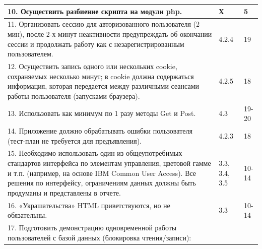 \documentclass[a4paper,12pt]{article}
\begin{document}
\begin{longtable}{|p{7cm}|p{3cm}|p{3cm}|}
    \hline
    10. Осуществить разбиение скрипта на модули php.                                                      & Х                                    & 5                                                                                       \\
    \hline
    11. Организовать сессию для авторизованного пользователя (2 мин),
    после 2-х минут неактивности предупреждать об окончании сессии и
    продолжать работу как с незарегистрированным пользователем.                                           & 4.2.4                                & 19                                                                                      \\
    \hline
    12. Осуществить запись одного или нескольких cookie, сохраняемых несколько минут;
    в cookie должна содержаться информация, которая передается между
    различными сеансами работы пользователя (запусками браузера).                                         & 4.2.5                                & 18                                                                                      \\
    \hline
    13. Использовать как минимум по 1 разу методы Get и Post.                                             & 4.3                                  & 19-20                                                                                   \\
    \hline
    14. Приложение должно обрабатывать ошибки пользователя
    (тест-план не требуется для предъявления).                                                            & 4.2.3                                & 18                                                                                      \\
    \hline
    15. Необходимо использовать один из общеупотребимых стандартов интерфейса по элементам управления,
    цветовой гамме и т.п. (например, на основе IBM Common User Access). Все решения по интерфейсу,
    ограничениям данных должны быть продуманы и представлены в отчете.                                    & 3.3, 3.4, 3.5                        & 10-14                                                                                   \\
    \hline
    16. «Украшательства» HTML приветствуются, но не обязательны.                                          & 3.3                                  & 10-14                                                                                   \\
    \hline
    17. Подготовить демонстрацию одновременной работы пользователей с базой данных (блокировка чтения/записи):

\end{longtable}
\end{document}
